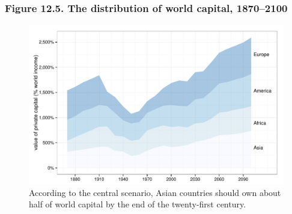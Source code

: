 \documentclass[t]{beamer}\usepackage[]{graphicx}\usepackage[]{color}
\newenvironment{knitrout}{}{} %
\begin{document}
\begin{frame}[label=Figure_12_5]
\frametitle{Figure 12.5. The distribution of world capital, 1870--2100}
\begin{figure}[t]
\begin{minipage}[b]{\textwidth}
\centering
\begin{knitrout}\footnotesize
{}\color{fgcolor}

{\centering \includegraphics[width=1\linewidth]{figures/color/Figure_12_5} 

}



\end{knitrout}
\caption{According to the central scenario, Asian countries should own about half of world capital by the end of the twenty-first century.} %
\end{minipage}
\end{figure}
\end{frame}
\end{document}
